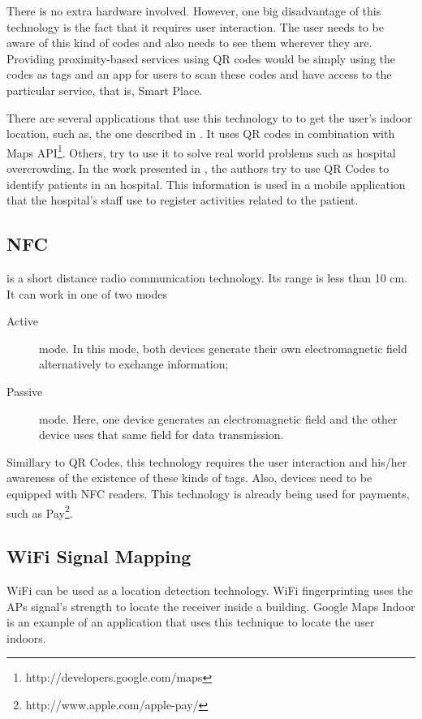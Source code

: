 There is no extra hardware involved.
However, one big disadvantage of this technology is the fact that it requires user interaction.
The user needs to be aware of this kind of codes and also needs to see them wherever they are.
Providing proximity-based services using \gls{QR} codes would be simply using the codes as tags and an app for users to scan these codes and have access to the particular service, that is, Smart Place.

There are several applications that use this technology to to get the user's indoor location, such as, the one described in \cite{qr_indoor}.
It uses \gls{QR} codes in combination with  Maps \gls{API}\footnote{http://developers.google.com/maps}.
Others, try to use it to solve real world problems such as hospital overcrowding.
In the work presented in \cite{qr_hospital}, the authors try to use \gls{QR} Codes to identify patients in an hospital.
This information is used in a mobile application that the hospital's staff use to register activities related to the patient.

\subsection{NFC}
\label{sub:background_near_field _communication}
\cite{nfc} is a short distance radio communication technology.
Its range is less than 10 cm.
It can work in one of two modes
\begin{description}
  \item[Active] mode. In this mode, both devices generate their own electromagnetic field alternatively to exchange information;
  \item[Passive] mode. Here, one device generates an electromagnetic field and the other device uses that same field for data transmission.
\end{description}

Simillary to \gls{QR} Codes, this technology requires the user interaction and his/her awareness of the existence of these kinds of tags.
Also, devices need to be equipped with \gls{NFC} readers.
This technology is already being used for payments, such as  Pay\footnote{http://www.apple.com/apple-pay/}.

\subsection{WiFi Signal Mapping}
\label{sub:background_google_maps_indoor}
\gls{WiFi} can be used as a location detection technology.
\gls{WiFi} fingerprinting\cite{wifi_fingerprinting} uses the \glspl{AP} signal's strength to locate the receiver inside a building.
Google Maps Indoor is an example of an application that uses this technique to locate the user indoors.

